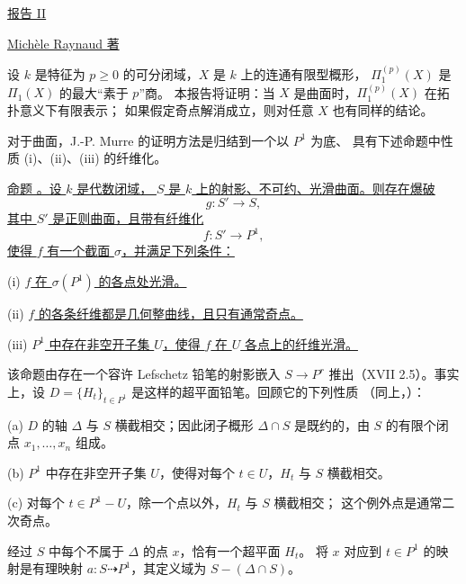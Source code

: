 \begin{center}
\underline{报告 II}

\vspace{1em}

\vspace{1em}
\underline{Mich\`ele Raynaud 著}
\end{center}

设 $k$ 是特征为 $p\geq 0$ 的可分闭域，$X$ 是 $k$ 上的连通有限型概形，
$\Pi_1^{(p)}(X)$ 是 $\Pi_1(X)$ 的最大“素于 $p$”商。
本报告将证明：当 $X$ 是曲面时，$\Pi_1^{(p)}(X)$ 在拓扑意义下有限表示；
如果假定奇点解消成立，则对任意 $X$ 也有同样的结论。

对于曲面，J.-P. Murre 的证明方法是归结到一个以 $P^1$ 为底、
具有下述命题中性质 (i)、(ii)、(iii) 的纤维化。

\underline{命题 。设 $k$ 是代数闭域，
$S$ 是 $k$ 上的射影、不可约、光滑曲面。则存在爆破}
\[
 g:S'\longrightarrow S,
\]
\underline{其中 $S'$ 是正则曲面，且带有纤维化}
\[
 f:S'\longrightarrow P^1,
\]
\underline{使得 $f$ 有一个截面 $\sigma$，并满足下列条件：}

(i) \underline{$f$ 在 $\sigma(P^1)$ 的各点处光滑。}

(ii) \underline{$f$ 的各条纤维都是几何整曲线，且只有通常奇点。}

(iii) \underline{$P^1$ 中存在非空开子集 $U$，使得 $f$ 在 $U$ 各点上的纤维光滑。}

该命题由存在一个容许 Lefschetz 铅笔的射影嵌入
$S\longrightarrow P^r$ 推出（XVII 2.5）。事实上，设
$D=\{H_t\}_{t\in P^1}$ 是这样的超平面铅笔。回顾它的下列性质
（同上，）：


(a) $D$ 的轴 $\Delta$ 与 $S$ 横截相交；因此闭子概形 $\Delta\cap S$
是既约的，由 $S$ 的有限个闭点 $x_1,\ldots,x_n$ 组成。

(b) $P^1$ 中存在非空开子集 $U$，使得对每个 $t\in U$，$H_t$ 与 $S$ 横截相交。

(c) 对每个 $t\in P^1-U$，除一个点以外，$H_t$ 与 $S$ 横截相交；
这个例外点是通常二次奇点。

经过 $S$ 中每个不属于 $\Delta$ 的点 $x$，恰有一个超平面 $H_t$。
将 $x$ 对应到 $t\in P^1$ 的映射是有理映射
$a:S\dashrightarrow P^1$，其定义域为 $S-(\Delta\cap S)$。

